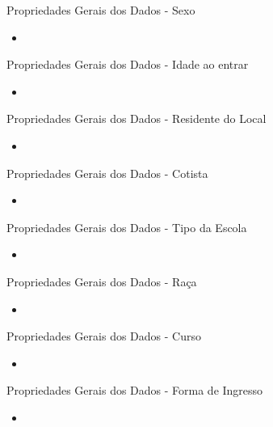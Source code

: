 \begin{frame}{Propriedades Gerais dos Dados - Sexo}
    \begin{itemize}[itemsep=3ex]
            \item <gráfico de barra mostrando porcentagem de meninos e meninas>
    \end{itemize}
\end{frame}

\begin{frame}{Propriedades Gerais dos Dados - Idade ao entrar}
    \begin{itemize}[itemsep=3ex]
            \item <gráfico de barra mostrando as idades>
    \end{itemize}
\end{frame}

\begin{frame}{Propriedades Gerais dos Dados - Residente do Local}
    \begin{itemize}[itemsep=3ex]
            \item <gráfico de barra mostrando se é local ou não - com missing values>
    \end{itemize}
\end{frame}

\begin{frame}{Propriedades Gerais dos Dados - Cotista}
    \begin{itemize}[itemsep=3ex]
            \item <gráfico de barra >
    \end{itemize}
\end{frame}

\begin{frame}{Propriedades Gerais dos Dados - Tipo da Escola}
    \begin{itemize}[itemsep=3ex]
            \item <gráfico de barra >
    \end{itemize}
\end{frame}

\begin{frame}{Propriedades Gerais dos Dados - Raça}
    \begin{itemize}[itemsep=3ex]
            \item <gráfico de barra >
    \end{itemize}
\end{frame}

\begin{frame}{Propriedades Gerais dos Dados - Curso}
    \begin{itemize}[itemsep=3ex]
            \item <gráfico de barra >
    \end{itemize}
\end{frame}

\begin{frame}{Propriedades Gerais dos Dados - Forma de Ingresso}
    \begin{itemize}[itemsep=3ex]
        \item <gráfico mostrando forma de ingresso>
    \end{itemize}
\end{frame}
